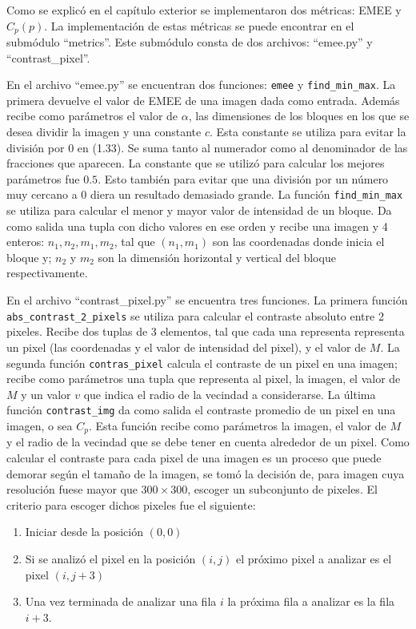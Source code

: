 Como se explic\'o en el cap\'itulo exterior se implementaron dos m\'etricas: EMEE y $C_p(p)$. La implementaci\'on de estas m\'etricas se puede encontrar en el subm\'odulo ``metrics''. Este subm\'odulo consta de dos archivos: ``emee.py'' y ``contrast\_pixel''. 

En el archivo ``emee.py'' se encuentran dos funciones: \verb|emee| y \verb|find_min_max|. La primera devuelve el valor de EMEE de una imagen dada como entrada. Adem\'as recibe como par\'ametros el valor de $\alpha$, las dimensiones de los bloques en los que se desea dividir la imagen y una constante $c$. Esta constante se utiliza para evitar la divisi\'on por $0$ en (1.33). Se suma tanto al numerador como al denominador de las fracciones que aparecen. La constante que se utiliz\'o para calcular los mejores par\'ametros fue $0.5$. Esto tambi\'en para evitar que una divisi\'on por un n\'umero muy cercano a 0 diera un resultado demasiado grande. La funci\'on \verb|find_min_max| se utiliza para calcular el menor y mayor valor de intensidad de un bloque. Da como salida una tupla con dicho valores en ese orden y recibe una imagen y 4 enteros: $n_1,n_2,m_1,m_2$, tal que $(n_1,m_1)$ son las coordenadas donde inicia el bloque y; $n_2$ y $m_2$ son la dimensi\'on horizontal y vertical del bloque respectivamente.

En el archivo ``contrast\_pixel.py'' se encuentra tres funciones. La primera funci\'on \verb|abs_contrast_2_pixels| se utiliza para calcular el contraste absoluto entre 2 pixeles. Recibe dos tuplas de 3 elementos, tal que cada una representa representa un pixel (las coordenadas y el valor de intensidad del pixel), y el valor de $M$.  La segunda funci\'on \verb|contras_pixel| calcula el contraste de un pixel en una imagen; recibe como par\'ametros una tupla que representa al pixel, la imagen, el valor de $M$ y un valor $v$ que indica el radio de la vecindad a considerarse. La \'ultima funci\'on \verb|contrast_img| da como salida el contraste promedio de un pixel en una imagen, o sea $C_p$. Esta funci\'on recibe como par\'ametros la imagen, el valor de $M$ y el radio de la vecindad que se debe tener en cuenta alrededor de un pixel. Como calcular el contraste para cada pixel de una imagen es un proceso que puede demorar seg\'un el tama\~no de la imagen, se tom\'o la decisi\'on de, para imagen cuya resoluci\'on fuese mayor que $300\times300$, escoger un subconjunto de pixeles. El criterio para escoger dichos pixeles fue el siguiente:

\begin{enumerate}
	\item Iniciar desde la posici\'on $(0,0)$
	\item Si se analiz\'o el pixel en la posici\'on $(i,j)$ el pr\'oximo pixel a analizar es el pixel $(i,j+3)$
	\item Una vez terminada de analizar una fila $i$ la pr\'oxima fila a analizar es la fila $i+3$.
\end{enumerate}

